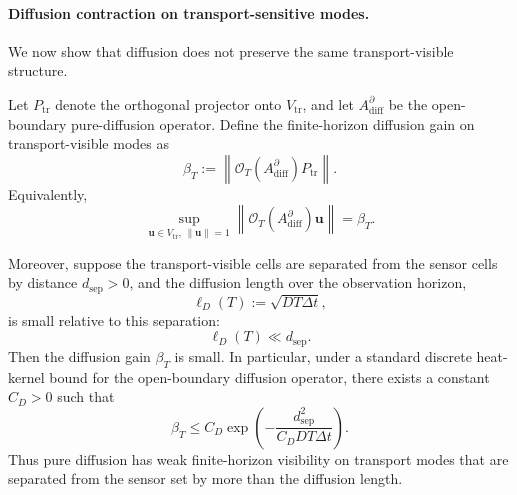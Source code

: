 \paragraph{Diffusion contraction on transport-sensitive modes.}
We now show that diffusion does not preserve the same transport-visible structure.


\begin{lemma}
\label{lem:diffusion_contraction}
Let \(P_{\mathrm{tr}}\) denote the orthogonal projector onto
\(V_{\mathrm{tr}}\), and let \(A_{\mathrm{diff}}^{\partial}\) be the
open-boundary pure-diffusion operator. Define the finite-horizon
diffusion gain on transport-visible modes as
\begin{equation}
\beta_T
:=
\left\|
\mathcal O_T(A_{\mathrm{diff}}^{\partial})
P_{\mathrm{tr}}
\right\|.
\label{eq:beta_T_def}
\end{equation}
Equivalently,
\begin{equation}
\sup_{\mathbf u\in V_{\mathrm{tr}},\,\|\mathbf u\|=1}
\left\|
\mathcal O_T(A_{\mathrm{diff}}^{\partial})\mathbf u
\right\|
=
\beta_T.
\end{equation}

Moreover, suppose the transport-visible cells are separated from the
sensor cells by distance \(d_{\mathrm{sep}}>0\), and the diffusion
length over the observation horizon,
\begin{equation}
\ell_D(T)
:=
\sqrt{D T\Delta t},
\end{equation}
is small relative to this separation:
\begin{equation}
\ell_D(T) \ll d_{\mathrm{sep}}.
\label{eq:diffusion_length_separation}
\end{equation}
Then the diffusion gain \(\beta_T\) is small. In particular, under a
standard discrete heat-kernel bound for the open-boundary diffusion
operator, there exists a constant \(C_D>0\) such that
\begin{equation}
\beta_T
\le
C_D
\exp\left(
-
\frac{
d_{\mathrm{sep}}^2
}{
C_D D T\Delta t
}
\right).
\label{eq:beta_heat_kernel_bound}
\end{equation}
Thus pure diffusion has weak finite-horizon visibility on transport
modes that are separated from the sensor set by more than the diffusion
length.
\end{lemma}

